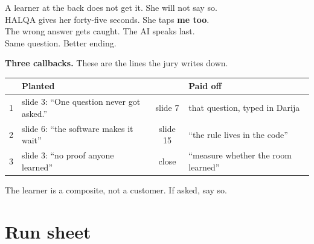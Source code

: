 \documentclass[11pt,a4paper]{article}
\begin{document}
A learner at the back does not get it. She will not say so.\\
HALQA gives her forty-five seconds. She taps \textbf{me too}.\\
The wrong answer gets caught. The AI speaks last.\\
Same question. Better ending.

\medskip
\textbf{Three callbacks.} These are the lines the jury writes down.

\medskip
\noindent
\begin{tabularx}{\linewidth}{@{}cXcX@{}}
\toprule
& \textbf{Planted} & & \textbf{Paid off} \\
\midrule
1 & slide 3: ``One question never got asked.'' & slide 7 & that question, typed in Darija \\
2 & slide 6: ``the software makes it wait'' & slide 15 & ``the rule lives in the code'' \\
3 & slide 3: ``no proof anyone learned'' & close & ``measure whether the room learned'' \\
\bottomrule
\end{tabularx}

\medskip
{\small\color{mute}The learner is a composite, not a customer. If asked, say so.}

\section{Run sheet}
\end{document}
